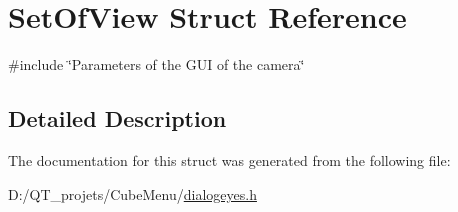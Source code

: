 \hypertarget{struct_set_of_view}{}\section{Set\+Of\+View Struct Reference}
\label{struct_set_of_view}


{\ttfamily \#include \char`\"{}Parameters of the G\+U\+I of the camera\char`\"{}}



\subsection{Detailed Description}


The documentation for this struct was generated from the following file\+:\begin{DoxyCompactItemize}
\item 
D\+:/\+Q\+T\+\_\+projets/\+Cube\+Menu/\hyperlink{dialogeyes_8h}{dialogeyes.\+h}\end{DoxyCompactItemize}
